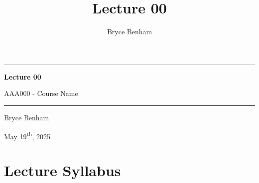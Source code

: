 \documentclass[11pt]{article}
\title{\Huge\bfseries{Lecture 00}}
\author{\Large{Bryce Benham}}
\date{\fancydate}
\newcommand{\fancydate}{May 19\textsuperscript{th}, 2025}
\begin{document}
\begin{titlepage}
	\centering
	\vspace*{3cm}

	\rule{\textwidth}{1pt}\par
	\vspace{0.5em}

	{\Huge\bfseries{Lecture 00}\par}
	\vspace{1em}
	{\LARGE{AAA000 - Course Name}\par}

	\vspace{0.5em}
	\rule{\textwidth}{1pt}\par

	\vspace{0.5cm}

	{\Large{Bryce Benham}\par}
	\vspace{0.5em}
	{\large \fancydate \par}

	\vfill
\end{titlepage}

\newpage

\section*{Lecture Syllabus}
\end{document}
